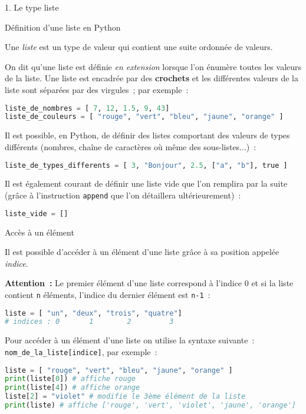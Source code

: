 
\begin{h2}1. Le type liste\end{h2}
\begin{h3} Définition d'une liste en Python\end{h3}
Une \textit{liste} est un type de valeur qui contient une suite ordonnée de valeurs.
\par
On dit qu'une liste est définie \textit{en extension} lorsque l'on énumère toutes les valeurs de la liste. Une liste est encadrée par des \textbf{crochets} et les différentes valeurs de la liste sont séparées par des virgules~; par exemple~:
\begin{lstlisting}[language=Python]
liste_de_nombres = [ 7, 12, 1.5, 9, 43]
liste_de_couleurs = [ "rouge", "vert", "bleu", "jaune", "orange" ]
\end{lstlisting}
Il est possible, en Python, de définir des listes comportant des valeurs de types différents (nombres, chaîne de caractères où même des sous-listes...)~:
 \begin{lstlisting}[language=Python]
liste_de_types_differents = [ 3, "Bonjour", 2.5, ["a", "b"], true ]
\end{lstlisting}
Il est également courant de définir une liste vide que l'on remplira par la suite (grâce à l'instruction \texttt{append} que l'on détaillera ultérieurement)~:
 \begin{lstlisting}[language=Python]
liste_vide = []
\end{lstlisting}
\begin{h3}Accès à un élément\end{h3}
Il est possible d'accéder à un élément d'une liste grâce à sa position appelée \textit{indice}.
\par
\textbf{Attention~: } Le premier élément d'une liste correspond à l'indice 0 et si la liste contient \texttt{n} éléments, l'indice du dernier élément est \texttt{n-1}~:
\begin{lstlisting}[language=Python]
liste = [ "un", "deux", "trois", "quatre"]
# indices : 0       1        2         3
\end{lstlisting}
Pour accéder à un élément d'une liste on utilise la syntaxe suivante~: \texttt{nom_de_la_liste[indice]}, par exemple~:
\begin{lstlisting}[language=Python]
liste = [ "rouge", "vert", "bleu", "jaune", "orange" ]
print(liste[0]) # affiche rouge
print(liste[4]) # affiche orange
liste[2] = "violet" # modifie le 3ème élément de la liste
print(liste) # affiche ['rouge', 'vert', 'violet', 'jaune', 'orange']
\end{lstlisting}
